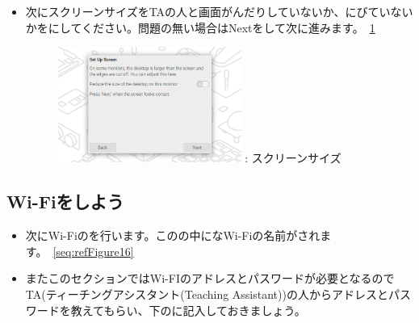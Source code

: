 \documentclass[a4paper,12pt]{jarticle}
\begin{document}
\begin{enumerate}
\begin{itemize}
\begin{figure}[h]
                      \end{figure}
                \end{itemize}
                \begin{itemize}
                  \item
                        次にスクリーンサイズをTAの人と画面がんだりしていないか、にびていないかをにしてください。問題の無い場合はNextをして次に進みます。~\ref{seq:refFigure15}
                        \begin{figure}[h]
                          \centering
                          \begin{minipage}{5.228cm}
                            {\upshape
                              \includegraphics[width=6.000cm]{sw_image05.png}
                              \newline
                              {\theFigure\label{seq:refFigure15}}:
                              スクリーンサイズ}
                          \end{minipage}
                        \end{figure}
                      \end{itemize}  
                      
  \clearpage                   
    \subsection{\theExercise Wi-Fiをしよう}
                \begin{itemize}
                  \item
                        次にWi-Fiのを行います。このの中になWi-Fiの名前がされます。~\ref{seq:refFigure16}
                        \item
                        \theQuestion またこのセクションではWi-FIのアドレスとパスワードが必要となるのでTA(ティーチングアシスタント(Teaching Assistant))の人からアドレスとパスワードを教えてもらい、下のに記入しておきましょう。
                        \begin{table}[htbp]
                          \centering


\end{table}
\end{itemize}
\end{enumerate}
\end{document}
